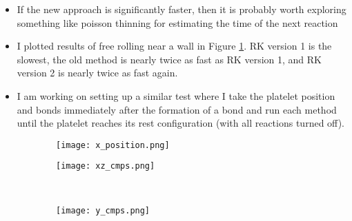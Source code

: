 \documentclass{article}
\begin{document}
\begin{itemize}
\begin{itemize}
  \item If the new approach is significantly faster, then it is
    probably worth exploring something like poisson thinning for
    estimating the time of the next reaction
  \item I plotted results of free rolling near a wall in Figure
    \ref{fig:free-results}. RK version 1 is the slowest, the old
    method is nearly twice as fast as RK version 1, and RK version 2
    is nearly twice as fast again.
  \item I am working on setting up a similar test where I take the
    platelet position and bonds immediately after the formation of a
    bond and run each method until the platelet reaches its rest
    configuration (with all reactions turned off).
  \end{itemize}
\end{itemize}

\begin{figure}[h]
  \centering
  \begin{subfigure}{0.49\textwidth}
    \texttt{[image: x\_position.png]}
  \end{subfigure}
  \hfill
  \begin{subfigure}{0.49\textwidth}
    \texttt{[image: xz\_cmps.png]}
  \end{subfigure}
  \\
  \begin{subfigure}{0.49\textwidth}
    \texttt{[image: y\_cmps.png]}
  \end{subfigure}
  \label{fig:free-results}
\end{figure}



\end{document}
